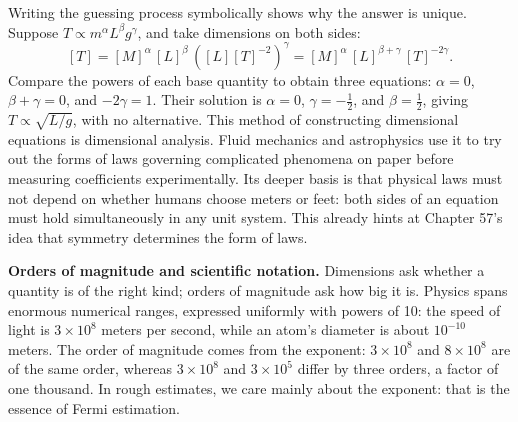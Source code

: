 \begin{mathbridge}
Writing the guessing process symbolically shows why the answer is unique. Suppose $T \propto m^{\alpha} L^{\beta} g^{\gamma}$, and take dimensions on both sides:
\[
[T] = [M]^{\alpha}\, [L]^{\beta}\, \left([L][T]^{-2}\right)^{\gamma}
    = [M]^{\alpha}\, [L]^{\beta+\gamma}\, [T]^{-2\gamma}.
\]
Compare the powers of each base quantity to obtain three equations: $\alpha = 0$, $\beta + \gamma = 0$, and $-2\gamma = 1$. Their solution is $\alpha=0$, $\gamma=-\tfrac12$, and $\beta=\tfrac12$, giving $T \propto \sqrt{L/g}$, with no alternative. This method of constructing dimensional equations is dimensional analysis. Fluid mechanics and astrophysics use it to try out the forms of laws governing complicated phenomena on paper before measuring coefficients experimentally. Its deeper basis is that physical laws must not depend on whether humans choose meters or feet: both sides of an equation must hold simultaneously in any unit system. This already hints at Chapter 57's idea that symmetry determines the form of laws.
\end{mathbridge}

\textbf{Orders of magnitude and scientific notation.} Dimensions ask whether a quantity is of the right kind; orders of magnitude ask how big it is. Physics spans enormous numerical ranges, expressed uniformly with powers of 10: the speed of light is $3\times10^8$ meters per second, while an atom's diameter is about $10^{-10}$ meters. The order of magnitude comes from the exponent: $3\times10^8$ and $8\times10^8$ are of the same order, whereas $3\times10^8$ and $3\times10^5$ differ by three orders, a factor of one thousand. In rough estimates, we care mainly about the exponent: that is the essence of Fermi estimation.

\begin{center}
\end{center}


